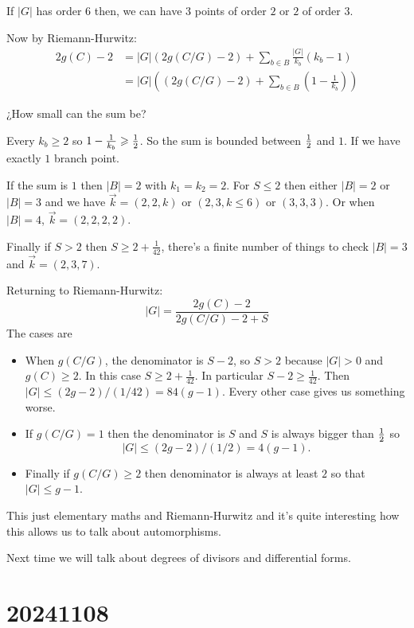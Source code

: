 \documentclass[12pt]{memoir}
\begin{document}
\begin{Rmk}
    If $|G|$ has order $6$ then, we can have $3$ points of order $2$ or $2$ of order $3$.
\end{Rmk}

Now by Riemann-Hurwitz:
\begin{align*}
2g(C)-2&=|G|(2g(C/G)-2)+\sum_{b\in B}\frac{|G|}{k_b}(k_b-1)\\
&=|G|\left((2g(C/G)-2)+\sum_{b\in B}\left(1-\frac{1}{k_b}\right)\right)
\end{align*}

\begin{center}
    ¿How small can the sum be?
\end{center}

Every $k_b\geq 2$ so $1-\frac{1}{k_b}\geq\half$. So the sum is bounded between $\half$ and $1$. If we have exactly $1$ branch point.\par
If the sum is $1$ then $|B|=2$ with $k_1=k_2=2$. For $S\leq 2$ then either $|B|=2$ or $|B|=3$ and we have $\vec{k}=(2,2,k)$ or $(2,3,k\leq 6)$ or $(3,3,3)$. Or when $|B|=4$, $\vec{k}=(2,2,2,2)$.\par
Finally if $S>2$ then $S\geq 2+\frac{1}{42}$, there's a finite number of things to check $|B|=3$ and $\vec{k}=(2,3,7)$.\par
Returning to Riemann-Hurwitz:
$$|G|=\frac{2g(C)-2}{2g(C/G)-2+S}$$
The cases are 
\begin{itemize}
    \item When $g(C/G)$, the denominator is $S-2$, so $S>2$ because $|G|>0$ and $g(C)\geq 2$. In this case $S\geq 2+\frac{1}{42}$.
    In particular $S-2\geq \frac{1}{42}$. Then $|G|\leq (2g-2)/(1/42)=84(g-1)$. Every other case gives us something worse.
    \item If $g(C/G)=1$ then the denominator is $S$ and $S$ is always bigger than $\half$ so 
    $$|G|\leq (2g-2)/(1/2)=4(g-1).$$
    \item Finally if $g(C/G)\geq 2$ then denominator is always at least $2$ so that $|G|\leq g-1$.
\end{itemize}
This just elementary maths and Riemann-Hurwitz and it's quite interesting how this allows us to talk about automorphisms.\par
Next time we will talk about degrees of divisors and differential forms.

\section{20241108}
\end{document}

